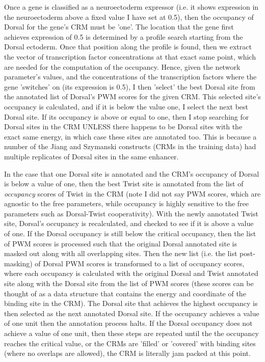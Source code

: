   Once a gene is classified as a neuroectoderm expressor (i.e. it shows expression in the neuroectoderm above a fixed value I have set at 0.5), then the occupancy of Dorsal for the gene's CRM must be 'one'.  The location that the gene first achieves expression of 0.5 is determined by a profile search starting from the Dorsal ectoderm.  Once that position along the profile is found, then we extract the vector of transcription factor concentrations at that exact same point, which are needed for the computation of the occupancy.  Hence, given the network parameter's values, and the concentrations of the transcription factors where the gene 'switches' on (its expression is 0.5), I then 'select' the best Dorsal site from the annotated list of Dorsal's PWM scores for the given CRM.  This selected site's occupancy is calculated, and if it is below the value one, I select the next best Dorsal site.  If its occupancy is above or equal to one, then I stop searching for Dorsal sites in the CRM UNLESS there happens to be Dorsal sites with the exact same energy, in which case these sites are annotated too.  This is because a number of the Jiang and Szymanski constructs (CRMs in the training data) had multiple replicates of Dorsal sites in the same enhancer. 
  
  In the case that one Dorsal site is annotated and the CRM's occupancy of Dorsal is below a value of one, then the best Twist site is annotated from the list of \textit{occupancy} scores of Twist in the CRM (note I did not say PWM scores, which are agnostic to the free parameters, while occupancy is highly sensitive to the free parameters such as Dorsal-Twist cooperativity).  With the newly annotated Twist site, Dorsal's occupancy is recalculated, and checked to see if it is above a value of one.  If the Dorsal occupancy is still below the critical occupancy, then the list of PWM scores is processed such that the original Dorsal annotated site is masked out along with all overlapping sites.  Then the new list (i.e. the list post-masking) of Dorsal PWM scores is transformed to a list of occupancy scores, where each occupancy is calculated with the original Dorsal and Twist annotated site along with the Dorsal site from the list of PWM scores (these scores can be thought of as a data structure that contains the energy and coordinate of the binding site in the CRM).  The Dorsal site that achieves the highest occupancy is then selected as the next annotated Dorsal site.  If the occupancy achieves a value of one unit then the annotation process halts.  If the Dorsal occupancy does not achieve a value of one unit, then these steps are repeated until the the occupancy reaches the critical value, or the CRMs are 'filled' or 'covered' with binding sites (where no overlaps are allowed), the CRM is literally jam packed at this point.  
  
